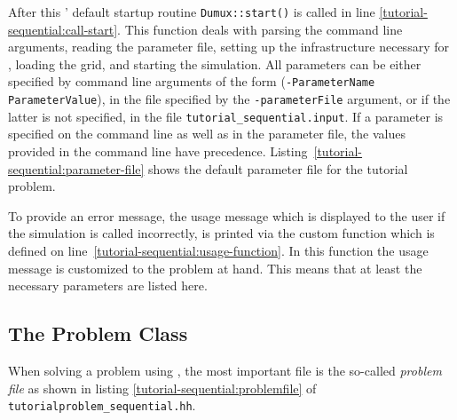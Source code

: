 After this \Dumux' default startup routine \texttt{Dumux::start()} is
called in line \ref{tutorial-sequential:call-start}. This function deals
with parsing the command line arguments, reading the parameter file,
setting up the infrastructure necessary for \Dune, loading the grid, and
starting the simulation. All parameters can
be either specified by command line arguments of the form
(\texttt{-ParameterName ParameterValue}), in the file specified by the
\texttt{-parameterFile} argument, or if the latter is not specified,
in the file \texttt{tutorial\_sequential.input}. If a parameter is
specified on the command line as well as in the parameter file, the
values provided in the command line have
precedence. Listing~\ref{tutorial-sequential:parameter-file} shows the
default parameter file for the tutorial problem.

\begin{lst}\label{tutorial-sequential:parameter-file} \mbox{}

\end{lst}

To provide an error message, the usage message which is displayed to
the user if the simulation is called incorrectly, is printed via the
custom function which is defined on
line~\ref{tutorial-sequential:usage-function}. In this function the usage
message is customized to the problem at hand. This means that at least
the necessary parameters are listed here.

\subsection{The Problem Class}
\label{sequential_problem}

When solving a problem using \Dumux, the most important file is the
so-called \textit{problem file} as shown in listing
\ref{tutorial-sequential:problemfile} of
\texttt{tutorialproblem\_sequential.hh}.

\begin{lst}\label{tutorial-sequential:problemfile} \mbox{}

\end{lst}

